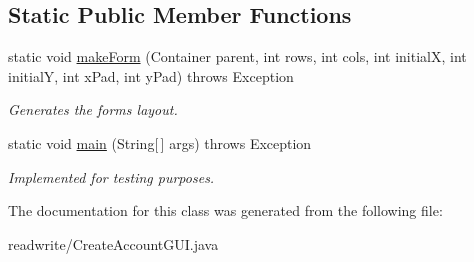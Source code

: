 \subsection*{Static Public Member Functions}
\begin{DoxyCompactItemize}
\item 
\mbox{\label{class_create_account_g_u_i_ac8094edda569c99d4d88f9d27fe64e24}} 
static void \hyperlink{class_create_account_g_u_i_ac8094edda569c99d4d88f9d27fe64e24}{make\+Form} (Container parent, int rows, int cols, int initialX, int initialY, int x\+Pad, int y\+Pad)  throws Exception 
\begin{DoxyCompactList}\small\item\em Generates the forms layout. \end{DoxyCompactList}\item 
\mbox{\label{class_create_account_g_u_i_a4ef58270bb46ae0431a317cfe5efb162}} 
static void \hyperlink{class_create_account_g_u_i_a4ef58270bb46ae0431a317cfe5efb162}{main} (String\mbox{[}$\,$\mbox{]} args)  throws Exception 
\begin{DoxyCompactList}\small\item\em Implemented for testing purposes. \end{DoxyCompactList}\end{DoxyCompactItemize}


The documentation for this class was generated from the following file\+:\begin{DoxyCompactItemize}
\item 
readwrite/Create\+Account\+G\+U\+I.\+java\end{DoxyCompactItemize}
